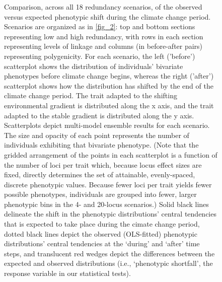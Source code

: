 \documentclass[9pt,twocolumn,twoside,lineno]{pnas-new}
\begin{document}
\begin{figure}
\caption{Comparison, across all 18 redundancy scenarios, of the observed versus expected phenotypic shift during the climate change period. Scenarios are organized as in \ref{fig_2}: top and bottom sections representing low and high redundancy, with rows in each section representing levels of linkage and columns (in before-after pairs) representing polygenicity. For each scenario, the left ('before') scatterplot shows the distribution of individuals’ bivariate phenotypes before climate change begins, whereas the right ('after') scatterplot shows how the distribution has shifted by the end of the climate change period. The trait adapted to the shifting environmental gradient is distributed along the x axis, and the trait adapted to the stable gradient is distributed along the y axis. Scatterplots depict multi-model ensemble results for each scenario. The size and opacity of each point represents the number of individuals exhibiting that bivariate phenotype. (Note that the gridded arrangement of the points in each scatterplot is a function of the number of loci per trait which, because locus effect sizes are fixed, directly determines the set of attainable, evenly-spaced, discrete phenotypic values. Because fewer loci per trait yields fewer possible phenotypes, individuals are grouped into fewer, larger phenotypic bins in the 4- and 20-locus scenarios.) Solid black lines delineate the shift in the phenotypic distributions’ central tendencies that is expected to take place during the cimate change period, dotted black lines depict the observed (OLS-fitted) phenotypic distributions’ central tendencies at the ‘during’ and ‘after’ time steps, and translucent red wedges depict the differences between the expected and observed distributions (i.e., ‘phenotypic shortfall’, the response variable in our statistical tests).
}
\label{fig:fig_4}
\end{figure}
\end{document}
